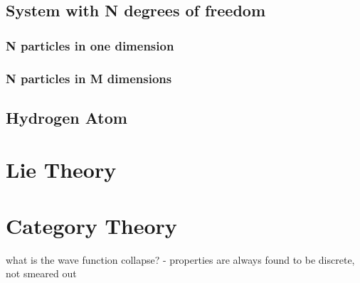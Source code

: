 \documentclass[a4paper]{article}
\begin{document}
\subsection{System with N degrees of freedom}
\subsubsection{N particles in one dimension}
\subsubsection{N particles in M dimensions}
\subsection{Hydrogen Atom}
\newpage
\section{Lie Theory}
\section{Category Theory}



what is the wave function collapse?
 - properties are always found to be discrete, not smeared out
\end{document}
